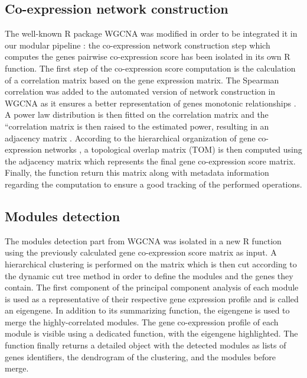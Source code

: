 \subsection{Co-expression network construction}

The well-known R package WGCNA  was modified in order to be integrated it in our modular pipeline : the co-expression network construction step which computes the genes pairwise co-expression score has been isolated in its own R function. The first step of the co-expression score computation is the calculation of a correlation matrix based on the gene expression matrix. The Spearman correlation was added to the automated version of network construction in WGCNA as it ensures a better representation of genes monotonic relationships .
A power law distribution is then fitted on the correlation matrix and the “correlation matrix is then raised to the estimated power, resulting in an adjacency matrix . According to the hierarchical organization of gene co-expression networks , a topological overlap matrix (TOM)  is then computed using the adjacency matrix which represents the final gene co-expression score matrix.
Finally, the function return this matrix along with metadata information regarding the computation to ensure a good tracking of the performed operations.


\subsection{Modules detection}

The modules detection part from WGCNA was isolated in a new R function using the previously calculated gene co-expression score matrix as input. A hierarchical clustering is performed on the matrix which is then cut according to the dynamic cut tree method  in order to define the modules and the genes they contain. The first component of the principal component analysis of each module is used as a representative of their respective gene expression profile and is called an eigengene. In addition to its summarizing function, the eigengene is used to merge the highly-correlated modules. The gene co-expression profile of each module is visible using a dedicated function, with the eigengene highlighted. The function finally returns a detailed object with the detected modules as lists of genes identifiers, the dendrogram of the clustering, and the modules before merge. 


